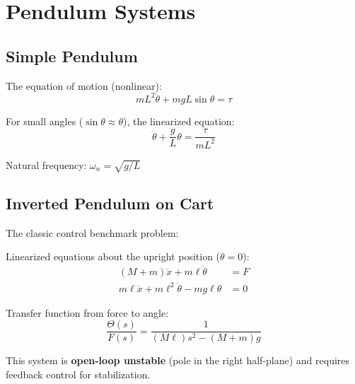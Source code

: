 \section{Pendulum Systems}
\label{sec:pendulum}

\subsection{Simple Pendulum}



The equation of motion (nonlinear):
\begin{equation}
mL^2\ddot{\theta} + mgL\sin\theta = \tau
\end{equation}

For small angles ($\sin\theta \approx \theta$), the linearized equation:
\begin{equation}
\ddot{\theta} + \frac{g}{L}\theta = \frac{\tau}{mL^2}
\end{equation}

Natural frequency: $\omega_n = \sqrt{g/L}$

\subsection{Inverted Pendulum on Cart}

The classic control benchmark problem:



Linearized equations about the upright position ($\theta = 0$):
\begin{align}
(M + m)\ddot{x} + m\ell\ddot{\theta} &= F \\
m\ell\ddot{x} + m\ell^2\ddot{\theta} - mg\ell\theta &= 0
\end{align}

Transfer function from force to angle:
\begin{equation}
\frac{\Theta(s)}{F(s)} = \frac{1}{(M\ell)s^2 - (M+m)g}
\end{equation}

This system is \textbf{open-loop unstable} (pole in the right half-plane) and requires feedback control for stabilization.

